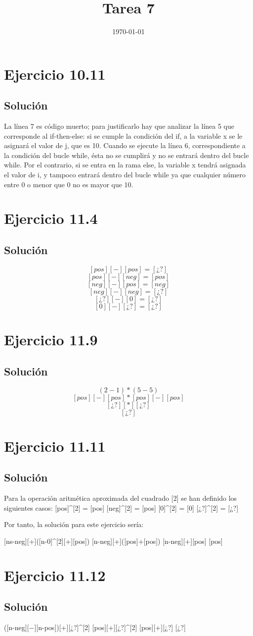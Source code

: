 \documentclass[11pt, a4paper, titlepage]{article}
\begin{document}
\title{Tarea 7}
\date{\today}
\maketitle
\newpage

\section*{Ejercicio 10.11}
\subsection*{Solución}

La línea 7 es código muerto; para justificarlo hay que analizar la línea 5 que
corresponde al if-then-else: si se cumple la condición del if, a la variable x
se le asignará el valor de j, que es 10. Cuando se ejecute la línea 6, correspondiente
a la condición del bucle while, ésta no se cumplirá y no se entrará dentro del bucle
while. Por el contrario, si se entra en la rama else, la variable x tendrá asignada
el valor de i, y tampoco entrará dentro del bucle while ya que cualquier número
entre 0 o menor que 0 no es mayor que 10.

\section*{Ejercicio 11.4}
\subsection*{Solución}
$$[pos] [-] [pos] = [¿?]$$
$$[pos] [-] [neg] = [pos]$$
$$[neg] [-] [pos] = [neg]$$
$$[neg] [-] [neg] = [¿?]$$
$$[¿?] [-] [0] = [¿?]$$
$$[0] [-] [¿?] = [¿?]$$

\section*{Ejercicio 11.9}
\subsection*{Solución}

$$(2-1) * (5-5)$$
$$[pos] [-] [pos] * [pos] [-] [pos]$$
$$[¿?] [*] [¿?]$$
$$[¿?]$$

\section*{Ejercicio 11.11}
\subsection*{Solución}
Para la operación aritmética aproximada del cuadrado [2] se han definido los
siguientes casos:
$$[pos]^[2] = [pos]
[neg]^[2] = [pos]
[0]^[2] = [0]
[¿?]^[2] = [¿?]

Por tanto, la solución para este ejercicio sería:

[ns-neg][+]([n-0]^[2][+][pos])
[n-neg][+]([pos]+[pos])
[n-neg][+][pos]
[pos]

\section*{Ejercicio 11.12}
\subsection*{Solución}
([n-neg][−][n-pos])[+][¿?]^[2]
            [pos][+][¿?]^[2]
            [pos][+][¿?]
            [¿?]
\end{document}
